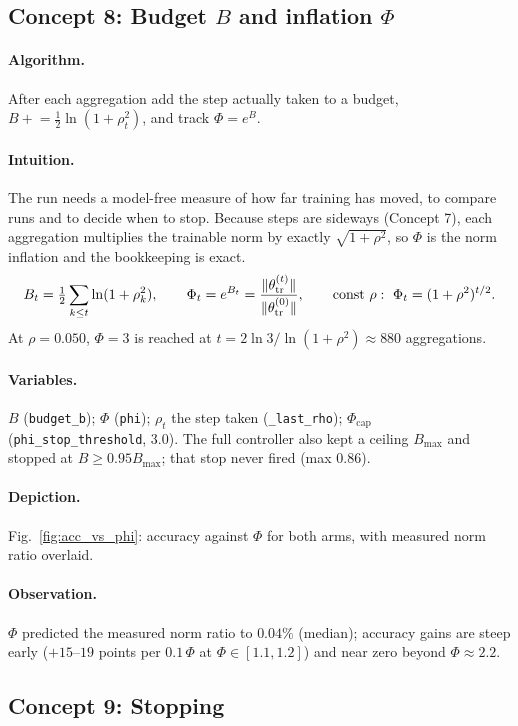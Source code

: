 \subsection{Concept 8: Budget $B$ and inflation $\Phi$}
\paragraph{Algorithm.}
After each aggregation add the step actually taken to a budget, $B\mathrel{+}=\tfrac12\ln(1+\rho_t^2)$, and track $\Phi=e^B$.
\paragraph{Intuition.}
The run needs a model-free measure of how far training has moved, to compare runs and to decide when to stop.
Because steps are sideways (Concept 7), each aggregation multiplies the trainable norm by exactly $\sqrt{1+\rho^2}$, so $\Phi$ is the norm inflation and the bookkeeping is exact.
\begin{equation}
B_t=\tfrac12\sum_{k\le t}\ln(1+\rho_k^2),\qquad
\Phi_t=e^{B_t}=\frac{\lVert \theta_{\mathrm{tr}}^{(t)}\rVert}{\lVert \theta_{\mathrm{tr}}^{(0)}\rVert},\qquad
\text{const }\rho:\ \Phi_t=(1+\rho^2)^{t/2}.
\end{equation}
At $\rho=0.050$, $\Phi=3$ is reached at $t=2\ln3/\ln(1+\rho^2)\approx880$ aggregations.
\paragraph{Variables.}
$B$ (\texttt{budget\_b}); $\Phi$ (\texttt{phi}); $\rho_t$ the step taken (\texttt{\_last\_rho}); $\Phi_{\mathrm{cap}}$ (\texttt{phi\_stop\_threshold}, 3.0).
The full controller also kept a ceiling $B_{\max}$ and stopped at $B\ge0.95B_{\max}$; that stop never fired (max $0.86$).
\paragraph{Depiction.} Fig.~\ref{fig:acc_vs_phi}: accuracy against $\Phi$ for both arms, with measured norm ratio overlaid.
\paragraph{Observation.}
$\Phi$ predicted the measured norm ratio to $0.04\%$ (median); accuracy gains are steep early ($+15$--$19$ points per $0.1\,\Phi$ at $\Phi\in[1.1,1.2]$) and near zero beyond $\Phi\approx2.2$.

\subsection{Concept 9: Stopping}
